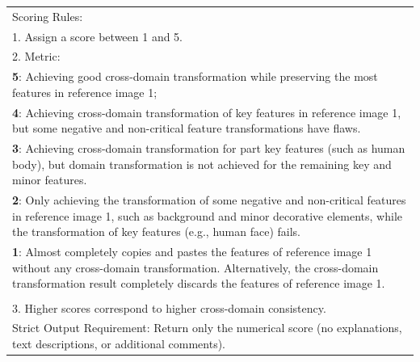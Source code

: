 \begin{table}[!t]
{\begin{tabular}{p{}}
Scoring Rules: \\
1. Assign a score between 1 and 5. \\
2. Metric: \\
         \hspace{1em}  \textbf{5}: Achieving good cross-domain transformation while preserving the most features in reference image 1; \\
         \hspace{1em} \textbf{4}: Achieving cross-domain transformation of key features in reference image 1, but some negative and non-critical feature transformations have flaws. \\
        \hspace{1em} \textbf{3}: Achieving cross-domain transformation for part key features (such as human body), but domain transformation is not achieved for the remaining key and minor features. \\
         \hspace{1em} \textbf{2}: Only achieving the transformation of some negative and non-critical features in reference image 1, such as background and minor decorative elements, while the transformation of key features (e.g., human face) fails. \\
         \hspace{1em} \textbf{1}: Almost completely copies and pastes the features of reference image 1 without any cross-domain transformation. Alternatively, the cross-domain transformation result completely discards the features of reference image 1. \\ \\
3. Higher scores correspond to higher cross-domain consistency. \\
Strict Output Requirement: Return only the numerical score (no explanations, text descriptions, or additional comments).  \\
 \bottomrule
\end{tabular}%
}
\end{table}


